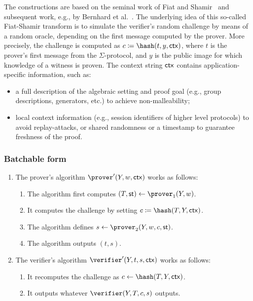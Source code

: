 \documentclass[runningheads]{llncs}
\begin{document}
The constructions are based on the seminal work of Fiat and Shamir~\cite{C:FiaSha86} and subsequent work, e.g., by Bernhard et al.~\cite{AC:BerPerWar12}.
The underlying idea of this so-called Fiat-Shamir transform is to simulate the verifier's random challenge by means of a random oracle, depending on the first message computed by the prover.
More precisely, the challenge is computed as $c\defeq\hash(t,y,\ctx)$, where $t$ is the prover's first message from the $\Sigma$-protocol, and $y$ is the public image for which knowledge of a witness is proven.
The context string $\mathsf{ctx}$ contains application-specific information, such as:
\begin{itemize}
  \item
    a full description of the algebraic setting and proof goal (e.g., group descriptions, generators, etc.) to achieve non-malleability;
  \item
    local context information (e.g., session identifiers of higher level protocols) to avoid replay-attacks, or shared randomness or a timestamp to guarantee freshness of the proof.
\end{itemize}

\subsubsection{Batchable form}


\begin{enumerate}
  \item
    The prover's algorithm $\prover'(Y,w,\ctx)$ works as follows:
    \begin{enumerate}
      \item
        The algorithm first computes $(T,\st)\gets\prover_1(Y,w)$.
      \item
        It computes the challenge by setting $c\defeq\hash(T, Y,\ctx)$.
      \item
        The algorithm defines $s\gets\prover_2(Y,w,c,\st)$.
      \item
        The algorithm outputs $(t,s)$.
    \end{enumerate}
  \item
    The verifier's algorithm $\verifier'(Y,t,s,\ctx)$ works as follows:
    \begin{enumerate}
      \item
        It recomputes the challenge as $c\gets\hash(T,Y,\ctx)$.
      \item
        It outputs whatever $\verifier(Y,T,c,s)$ outputs.
    \end{enumerate}
\end{enumerate}
\end{document}
